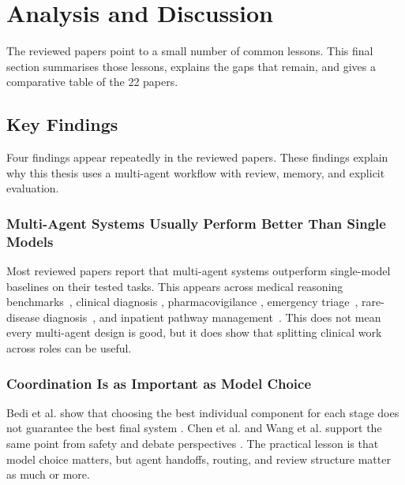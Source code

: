 \section{Analysis and Discussion}
\label{sec:discussion}

The reviewed papers point to a small number of common lessons. This final section
summarises those lessons, explains the gaps that remain, and gives a comparative
table of the 22 papers.

\FloatBarrier
\subsection{Key Findings}
\label{subsec:findings}

Four findings appear repeatedly in the reviewed papers. These findings explain why
this thesis uses a multi-agent workflow with review, memory, and explicit
evaluation.

\subsubsection*{Multi-Agent Systems Usually Perform Better Than Single Models}

Most reviewed papers report that multi-agent systems outperform single-model
baselines on their tested tasks. This appears across medical reasoning
benchmarks~\cite{Tang2024MedAgents}, clinical diagnosis
\cite{Kim2024MDAgents,Zhou2024ZODIAC,Yan2024ClinicalLab}, pharmacovigilance
\cite{Choi2024MALADE}, emergency triage~\cite{Lu2024TriageAgent},
rare-disease diagnosis~\cite{Chen2024RareAgents}, and inpatient pathway
management~\cite{Chen2025MAP}. This does not mean every multi-agent design is
good, but it does show that splitting clinical work across roles can be useful.

\subsubsection*{Coordination Is as Important as Model Choice}

Bedi et al. show that choosing the best individual component for each stage does
not guarantee the best final system \cite{Bedi2025OptParadox}. Chen et al. and
Wang et al. support the same point from safety and debate perspectives
\cite{Chen2025MedSentry,Wang2025Catfish}. The practical lesson is that model
choice matters, but agent handoffs, routing, and review structure matter as much
or more.

